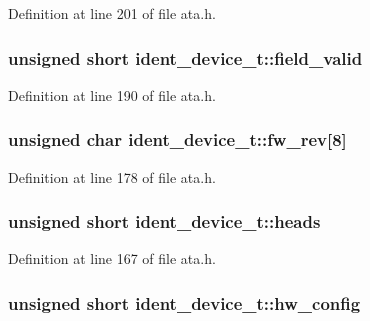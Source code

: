 Definition at line 201 of file ata.\+h.

\subsubsection[{\texorpdfstring{field\+\_\+valid}{field_valid}}]{\setlength{\rightskip}{0pt plus 5cm}unsigned short ident\+\_\+device\+\_\+t\+::field\+\_\+valid}\hypertarget{structident__device__t_ae127ec2092115637970e5993909d6c02}{}\label{structident__device__t_ae127ec2092115637970e5993909d6c02}


Definition at line 190 of file ata.\+h.

\subsubsection[{\texorpdfstring{fw\+\_\+rev}{fw_rev}}]{\setlength{\rightskip}{0pt plus 5cm}unsigned char ident\+\_\+device\+\_\+t\+::fw\+\_\+rev\mbox{[}8\mbox{]}}\hypertarget{structident__device__t_a17cf9b96ebf881a367f7c4807d9e4ebc}{}\label{structident__device__t_a17cf9b96ebf881a367f7c4807d9e4ebc}


Definition at line 178 of file ata.\+h.

\subsubsection[{\texorpdfstring{heads}{heads}}]{\setlength{\rightskip}{0pt plus 5cm}unsigned short ident\+\_\+device\+\_\+t\+::heads}\hypertarget{structident__device__t_abe75fc82f62aeb25eeeaebc14832cee5}{}\label{structident__device__t_abe75fc82f62aeb25eeeaebc14832cee5}


Definition at line 167 of file ata.\+h.

\subsubsection[{\texorpdfstring{hw\+\_\+config}{hw_config}}]{\setlength{\rightskip}{0pt plus 5cm}unsigned short ident\+\_\+device\+\_\+t\+::hw\+\_\+config}\hypertarget{structident__device__t_a1f9499790ad26349d6df3e7c8f52c2fa}{}\label{structident__device__t_a1f9499790ad26349d6df3e7c8f52c2fa}


